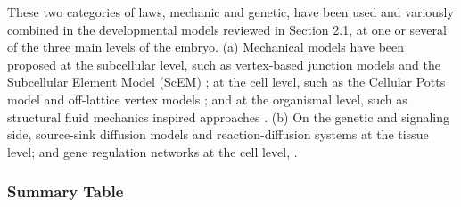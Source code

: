   These two categories of laws, mechanic and genetic, have been used and variously combined in the developmental models reviewed in Section 2.1, at one or several of the three main levels of the embryo. (a) Mechanical models have been proposed at the subcellular level, such as vertex-based junction models \cite{Weliky:1990wn}\cite{Weliky:1991vf}\cite{Sahlin:2010eu}\cite{Farhadifar:2007vj} and the Subcellular Element Model (ScEM) \cite{Newman:2005ux}\cite{Sandersius:2011ew}\cite{Sandersius:2011ug}; at the cell level, such as the Cellular Potts model \cite{Glazier:1993ck} and off-lattice vertex models \cite{Schaller:2004vs}; and at the organismal level, such as structural fluid mechanics inspired approaches \cite{Fleury:2005ul}\cite{Fleury:2011wm}. (b) On the genetic and signaling side, source-sink diffusion models \cite{Wolpert:1969wu} and reaction-diffusion systems \cite{Turing:1952vn}\cite{Gierer:1972et}\cite{Meinhardt:1982tv} at the tissue level; and gene regulation networks at the cell level, \cite{Longabaugh:2005bq}. 

\subsubsection{Summary Table }

